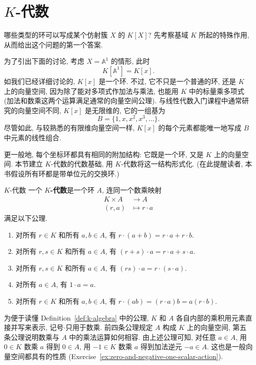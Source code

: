 \section{\texorpdfstring{$K$}{K}-代数}\label{sec:k-algebras}

哪些类型的环可以写成某个仿射簇 $X$ 的 $K[X]$? 先考察基域 $K$ 所起的特殊作用, 从而给出这个问题的第一个答案.

为了引出下面的讨论, 考虑 $X=\mathbb{A}^{1}$ 的情形, 此时
\[
  K[\mathbb{A}^{1}]=K[x].
\]
如我们已经详细讨论的, $K[x]$ 是一个环. 不过, 它不只是一个普通的环, 还是 $K$ 上的向量空间, 因为除了能对多项式作加法与乘法, 也能用 $K$ 中的标量乘多项式 (加法和数乘这两个运算满足通常的向量空间公理). 与线性代数入门课程中通常研究的向量空间不同, $K[x]$ 是无限维的, 它的一组基为
\[
  B=\{1,x,x^{2},x^{3},\ldots\}.
\]
尽管如此, 与较熟悉的有限维向量空间一样, $K[x]$ 的每个元素都能唯一地写成 $B$ 中元素的线性组合.

更一般地, 每个坐标环都具有相同的附加结构: 它既是一个环, 又是 $K$ 上的向量空间. 本节建立 $K$-代数的代数基础, 用 $K$-代数将这一结构形式化. (在此提醒读者, 本书假设所有环都是带单位元的交换环.)

\begin{Definition}{$K$-代数}\leavevmode\label{def:k-algebra}
  一个 \textbf{$K$-代数}是一个环 $A$, 连同一个数乘映射
  \[
    \begin{aligned}
      K\times A&\to A\\
      (r,a)&\mapsto r\cdot a
    \end{aligned}
  \]
  满足以下公理.
  \begin{enumerate}[label=\arabic*.]
    \item 对所有 $r\in K$ 和所有 $a,b\in A$, 有 $r\cdot(a+b)=r\cdot a+r\cdot b$.
    \item 对所有 $r,s\in K$ 和所有 $a\in A$, 有 $(r+s)\cdot a=r\cdot a+s\cdot a$.
    \item 对所有 $r,s\in K$ 和所有 $a\in A$, 有 $(rs)\cdot a=r\cdot(s\cdot a)$.
    \item 对所有 $a\in A$, 有 $1\cdot a=a$.
    \item 对所有 $r\in K$ 和所有 $a,b\in A$, 有 $r\cdot(ab)=(r\cdot a)b=a(r\cdot b)$.
  \end{enumerate}
\end{Definition}

\BookPairedNoteLeft
  {为便于读懂 Definition~\ref{def:k-algebra} 中的公理, $K$ 和 $A$ 各自内部的乘积用元素直接并写来表示, 记号\textquotedbl{}$\cdot$\textquotedbl{}只用于数乘.}
  {前四条公理规定 $A$ 构成 $K$ 上的向量空间, 第五条公理说明数乘与 $A$ 中的乘法运算如何相容.}
\noindent 由上述公理可知, 对任意 $a\in A$, 用 $0\in K$ 数乘 $a$ 得到 $0\in A$, 用 $-1\in K$ 数乘 $a$ 得到加法逆元 $-a\in A$. 这也是一般向量空间都具有的性质 (Exercise~\ref{ex:zero-and-negative-one-scalar-action}).

